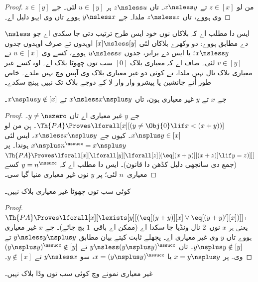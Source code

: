 \documentclass[../../../include/open-logic-section]{subfiles}
\begin{document}
\begin{proof}
من لو $z \in [x]$ تے $x \nsless y$۔ تاں
$z \nsless u$ ہر $u \in [y]$ لئی۔ جے
$z \in [y]$ وی ہووے، تاں $z \nsless z$ ملدا۔
جے $y \nsless x$ ہووے تاں وی ایہو دلیل اے۔
\end{proof}

\begin{explain}
ایس دا مطلب اے کہ بلاکاں نوں خود ایس طرح ترتیب دتی جا سکدی
اے جو $\nsless$ دے مطابق ہووے: دو وکھرے بلاکاں لئی $[x] \nsless [y]$
اوہدوں تے صرف اوہدوں جدوں $x \nsless y$؛ یا ایس دے
برابر، جدوں $u \nsless v$ ہووے، کسے وی
$u \in [x]$ تے $v \in [y]$ لئی۔
صاف اے کہ معیاری بلاک $[0]$
سب توں چھوٹا بلاک اے۔ اوہ کسے غیر معیاری بلاک نال
نہیں ملدا، تے کوئی دو غیر معیاری بلاک وی آپس وچ
نہیں ملدے۔ خاص طور اُتے جانشین یا پیشرو وار وار
لا کے دوجے بلاک تک نہیں پہنچ سکدے۔
\end{explain}

\begin{prop}
جے $x$ تے $y$ غیر معیاری ہون، تاں
$x \nsless x \nsplus y$ تے $x
\nsplus y \notin [x]$۔
\end{prop}

\begin{proof}
جے $y$ غیر معیاری اے تاں $y \neq \nszero$۔
$\Th{PA} \Proves
\lforall[x][(y \neq \Obj{0} \lif x < (x+y))]$۔
ہن من لو $x \nsplus y \in [x]$۔ کیوں جے
$x \nsless x \nsplus y$، ایس لئی
$x \nsplus n^\nssucc = x \nsplus y$ ہوندا۔
پر $\Th{PA} \Proves
\lforall[x][\lforall[y][\lforall[z][(\eq[(x+y)][(x+z)] \lif y = z)]]]$
(جمع دی سانجھی دلیل کڈھن دا قانون)۔ ایس دا مطلب اے کہ
$y = n^\nssucc$ کسے معیاری~$n$ لئی؛ پر $y$ نوں
غیر معیاری منیا گیا سی۔
\end{proof}

\begin{prop}
کوئی سب توں چھوٹا غیر معیاری بلاک نہیں۔
\end{prop}

\begin{proof}
$\Th{PA} \Proves \lforall[x][\lexists[y][(\eq[(y+y)][x] \lor
      \eq[(y+y)'][x])]]$؛ یعنی ہر $x$ نوں~$2$ نال
ونڈیا جا سکدا اے (ممکن اے باقی~$1$ بچ جائے)۔
جے $x$ غیر معیاری ہووے تاں $y$ وی غیر معیاری اے۔
پچھلے ثابت کیتے بیان مطابق $y \nsless y \nsplus y$ تے
$y \nsplus y \notin [y]$۔ تاں
$y \nsless (y \nsplus y)^\nssucc$ تے
$(y \nsplus y)^\nssucc \notin [y]$ وی۔
پر $x = y \nsplus y$ یا
$x = (y \nsplus y)^\nssucc$، سو
$y \nsless x$ تے $y \notin [x]$۔
\end{proof}

\begin{prop}
غیر معیاری نمونے وچ کوئی سب توں وڈا بلاک نہیں۔
\end{prop}
\end{document}
